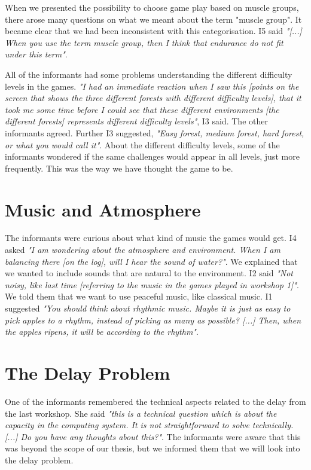 When we presented the possibility to choose game play based on muscle groups, there arose many questions on what we meant about the term "muscle group". It became clear that we had been inconsistent with this categorisation. I5 said \emph{"[...] When you use the term muscle group, then I think that endurance do not fit under this term"}.   

All of the informants had some problems understanding the different difficulty levels in the games. \emph{"I had an immediate reaction when I saw this [points on the screen that shows the three different forests with different difficulty levels], that it took me some time before I could see that these different environments [the different forests] represents different difficulty levels"}, I3 said. The other informants agreed. Further I3 suggested, \emph{"Easy forest, medium forest, hard forest, or what you would call it"}. About the different difficulty levels, some of the informants wondered if the same challenges would appear in all levels, just more frequently. This was the way we have thought the game to be.

\section{Music and Atmosphere}

The informants were curious about what kind of music the games would get. I4 asked \emph{"I am wondering about the atmosphere and environment. When I am balancing there [on the log], will I hear the sound of water?"}. We explained that we wanted to include sounds that are natural to the environment. I2 said \emph{"Not noisy, like last time [referring to the music in the games played in workshop 1]"}. We told them that we want to use peaceful music, like classical music. I1 suggested \emph{"You should think about rhythmic music. Maybe it is just as easy to pick apples to a rhythm, instead of picking as many as possible? [...] Then, when the apples ripens, it will be according to the rhythm"}. 

\section{The Delay Problem}


One of the informants remembered the technical aspects related to the delay from the last workshop. She said  \emph{"this is a technical question which is about the capacity in the computing system. It is not straightforward to solve technically. [...] Do you have any thoughts about this?"}. The informants were aware that this was beyond the scope of our thesis, but we informed them that we will look into the delay problem.

